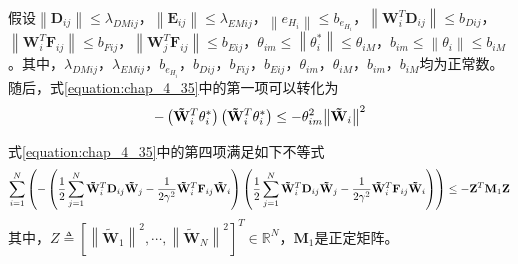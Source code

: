 假设$\left\| {{{\mathbf{D}}_{ij}}} \right\| \leqslant {\lambda _{DMij}}$，$\left\| {{{\mathbf{E}}_{ij}}} \right\| \leqslant {\lambda _{EMij}}$，$\left\| {{e_{{H_i}}}} \right\| \leqslant {b_{{e_{{H_i}}}}}$，$\left\| {{\mathbf{W}}_i^T{{\mathbf{D}}_{ij}}} \right\| \leqslant {b_{Dij}}$，$\left\| {{\mathbf{W}}_i^T{{\mathbf{F}}_{ij}}} \right\| \leqslant {b_{Fij}}$，$\left\| {{\mathbf{W}}_j^T{{\mathbf{F}}_{ij}}} \right\| \leqslant {b_{Eij}}$，${\theta _{im}} \leqslant \left\| {\theta _i^*} \right\| \leqslant {\theta _{iM}}$，${b_{im}} \leqslant \left\| {{\theta _i}} \right\| \leqslant {b_{iM}}$。其中，${\lambda _{DMij}}$，${\lambda _{EMij}}$，${b_{{e_{{H_i}}}}}$，${b_{Dij}}$，${b_{Fij}}$，${b_{Eij}}$，${\theta _{im}}$，${\theta _{iM}}$，${b_{im}}$，${b_{iM}}$均为正常数。随后，式\ref{equation:chap_4_35}中的第一项可以转化为
\begin{equation}
  - \left( {{\bf{\tilde W}}_i^T{\bf{\theta }}_i^*} \right)\left( {{\bf{\tilde W}}_i^T{\bf{\theta }}_i^*} \right) \le  - \theta _{im}^2{\left\| {{{{\bf{\tilde W}}}_i}} \right\|^2}
\end{equation}

式\ref{equation:chap_4_35}中的第四项满足如下不等式
\begin{equation}
  \sum\limits_{i = 1}^N {\left( { - \left( {\frac{1}{2}\sum\limits_{j = 1}^N {{\bf{\tilde W}}_i^T{{\bf{D}}_{ij}}{{{\bf{\tilde W}}}_j} - \frac{1}{{2{\gamma ^2}}}{\bf{\tilde W}}_i^T{{\bf{F}}_{ij}}{{{\bf{\tilde W}}}_i}} } \right)\left( {\frac{1}{2}\sum\limits_{j = 1}^N {{\bf{\tilde W}}_i^T{{\bf{D}}_{ij}}{{{\bf{\tilde W}}}_j} - \frac{1}{{2{\gamma ^2}}}{\bf{\tilde W}}_i^T{{\bf{F}}_{ij}}{{{\bf{\tilde W}}}_i}} } \right)} \right)}  \le  - {{\bf{Z}}^T}{{\bf{M}}_1}{\bf{Z}}
\end{equation}
其中，$Z \triangleq {\left[ {{{\left\| {{{{\mathbf{\tilde W}}}_1}} \right\|}^2}, \cdots ,{{\left\| {{{{\mathbf{\tilde W}}}_N}} \right\|}^2}} \right]^T} \in {\mathbb{R}^N}$，${{\mathbf{M}}_1}$是正定矩阵。

